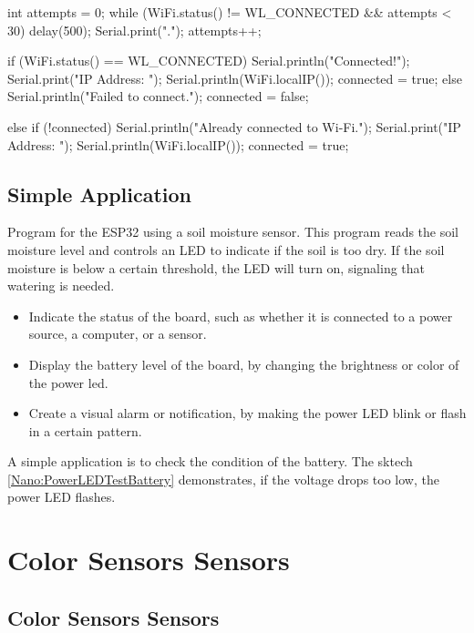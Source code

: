 \begin{Arduino}
{{			int attempts = 0;
			while (WiFi.status() != WL_CONNECTED && attempts < 30) {
				delay(500);
				Serial.print(".");
				attempts++;
			}
			
			if (WiFi.status() == WL_CONNECTED) {
				Serial.println("Connected!");
				Serial.print("IP Address: ");
				Serial.println(WiFi.localIP());
				connected = true;
			} else {
				Serial.println("Failed to connect.");
				connected = false;
			}
		} else if (!connected) {
			Serial.println("Already connected to Wi-Fi.");
			Serial.print("IP Address: ");
			Serial.println(WiFi.localIP());
			connected = true;
		}
	}
	
	
\end{Arduino}

\subsection{Simple Application}

Program for the ESP32 using a soil moisture sensor. This program reads the soil moisture level and controls an LED to indicate if the soil is too dry. If the soil moisture is below a certain threshold, the LED will turn on, signaling that watering is needed.

\begin{itemize}
	\item Indicate the status of the board, such as whether it is connected to a power source, a computer, or a sensor.
	\item  Display the battery level of the board, by changing the brightness or color of the power \ac{led}.
	\item Create a visual alarm or notification, by making the power LED blink or flash in a certain pattern.
\end{itemize}

\bigskip

A simple application is to check the condition of the battery. The sktech \ref{Nano:PowerLEDTestBattery} demonstrates, if the voltage drops too low, the power LED flashes.

{
	\label{Nano:PowerLEDTestBattery}
}

\section{Color Sensors Sensors}
\subsection{Color Sensors Sensors}

